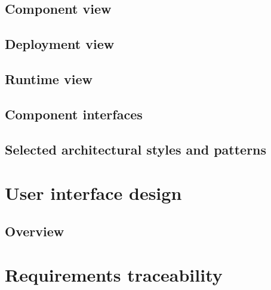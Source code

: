 \documentclass[10pt,english, openany]{book}
\begin{document}


\section{Component view}



\pagebreak

\section{Deployment view}



\pagebreak

\section{Runtime view}



\section{Component interfaces}



\section{Selected architectural styles and patterns}




\chapter{User interface design}

\section{Overview}



\chapter{Requirements traceability}
\end{document}
